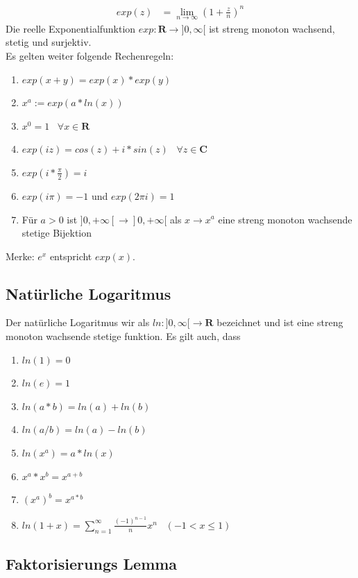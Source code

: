 \documentclass[8pt]{extarticle}
\begin{document}
\begin{multicols*}{3}
\begin{align*}
  exp(z) &= \lim_{n \rightarrow \infty} (1 + \frac{z}{n})^n
\end{align*}
Die reelle Exponentialfunktion $exp: \mathbf{R} \rightarrow ]0, \infty[$ ist streng monoton wachsend,
stetig und surjektiv.\\
Es gelten weiter folgende Rechenregeln:
\begin{enumerate}
  \item $exp(x + y) = exp(x) * exp(y)$
  \item $x^a := exp(a * ln(x))$
  \item $x^0 = 1 \;\;\; \forall x \in \mathbf{R}$
  \item $exp(iz) = cos(z) + i*sin(z) \;\;\; \forall z \in \mathbf{C}$
  \item $exp(i*\frac{\pi}{2}) = i$
  \item $exp(i\pi) = -1$ und $exp(2\pi i) = 1$
  \item Für $a > 0$ ist $]0, +\infty[ \rightarrow ]0, +\infty[$ als $x \rightarrow x^a$ eine
  streng monoton wachsende stetige Bijektion
\end{enumerate}
Merke: $e^x$ entspricht $exp(x)$.

\subsection{Natürliche Logaritmus}

Der natürliche Logaritmus wir als $ln: ]0, \infty[ \rightarrow \mathbf{R}$ bezeichnet
und ist eine streng monoton wachsende stetige funktion. Es gilt auch, dass
\begin{enumerate}
  \item $ln(1) = 0$
  \item $ln(e) = 1$
  \item $ln(a * b) = ln(a) + ln(b)$
  \item $ln(a / b) = ln(a) - ln(b)$
  \item $ln(x^a) = a * ln(x)$
  \item $x^a * x^b = x^{a + b}$
  \item $(x^a)^b = x^{a * b}$
  \item $ln(1+x) = \sum_{n=1}^{\infty} \frac{(-1)^{n-1}}{n} x^n \;\;\; (-1 < x \leq 1)$
\end{enumerate}

\subsection{Faktorisierungs Lemma}


\end{multicols*}
\end{document}
